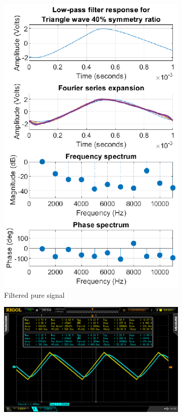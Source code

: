 \documentclass[notitlepage, a4paper, 11pt]{article}
\begin{document}
\begin{figure}[H]
\begin{subfigure}[][][t]{0.26\textwidth}
			\includegraphics[width=\textwidth]{../Matlab/img/RCLPtri40}
			\caption{Filtered pure signal}
		\end{subfigure}
		\hfill
		\begin{subfigure}[][][t]{0.45\textwidth}
			\includegraphics[width=\textwidth, trim=85 50 112 45, clip]{../img/osc/DS2_QuickPrint1.png}

\end{subfigure}
\end{figure}
\end{document}
